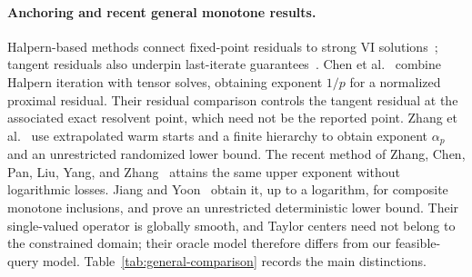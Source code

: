 \documentclass[11pt]{article}
\numberwithin{equation}{section}
\theoremstyle{definition}
\theoremstyle{remark}
\newcommand{\ap}{\alpha_p}
\begin{document}
\paragraph{Anchoring and recent general monotone results.}
Halpern-based methods connect fixed-point residuals to strong VI
solutions~\cite{diakonikolas2020}; tangent residuals also underpin
last-iterate guarantees~\cite{cai2022}. Chen et
al.~\cite{chen2026halpern} combine Halpern iteration with tensor solves,
obtaining exponent $1/p$ for a normalized proximal residual. Their
residual comparison controls the tangent residual at the associated
exact resolvent point, which need not be the reported point. Zhang et
al.~\cite{zhang2026} use extrapolated warm starts and a finite hierarchy
to obtain exponent $\ap$ and an unrestricted randomized lower bound.
The recent method of Zhang, Chen, Pan, Liu, Yang, and
Zhang~\cite{zhangchen2026} attains the same upper exponent without
logarithmic losses. Jiang and Yoon~\cite{jiangyoon2026} obtain it, up to
a logarithm, for composite monotone inclusions, and prove an unrestricted
deterministic lower bound. Their single-valued operator is globally
smooth, and Taylor centers need not belong to the constrained domain;
their oracle model therefore differs from our feasible-query model.
Table~\ref{tab:general-comparison} records the main distinctions.
\end{document}
